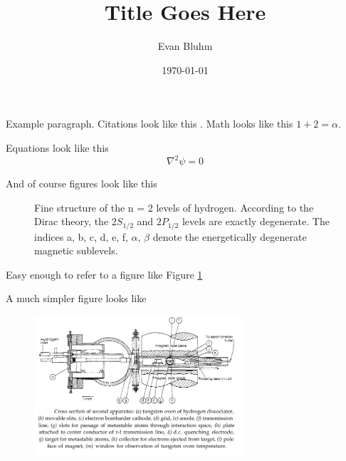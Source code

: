\documentclass[
reprint,
amsmath,amssymb,showpacs,
aps,citeautoscript,prb,
onecolumn,notitlepage
]{revtex4-1}
\begin{document}

\title{Title Goes Here}

\author{Evan Bluhm}
 
\noaffiliation
\date{\today}



\maketitle
{}

Example paragraph. Citations look like this \cite{Lamb01}. Math looks like this $1 + 2 = \alpha$. 

Equations look like this
\begin{equation}
\nabla ^2 \psi = 0
\end{equation}

And of course figures look like this

\begin{figure}[H]
\centering
{}
\caption{Fine structure of the  n = 2 levels of hydrogen.  According to the Dirac theory, the $2S_{1/2}$ and $2P_{1/2}$ levels are exactly degenerate.  The indices a, b, c, d, e, f, $\alpha$, $\beta$ denote the energetically degenerate magnetic sublevels.}
\label{fig:levels}
\end{figure}

Easy enough to refer to a figure like Figure \ref{fig:levels}

A much simpler figure looks like

\begin{figure}[H]
    \begin{center}
        \includegraphics[width=0.7\textwidth]{lambsetup.png}
    \end{center}
\end{figure}
\end{document}
